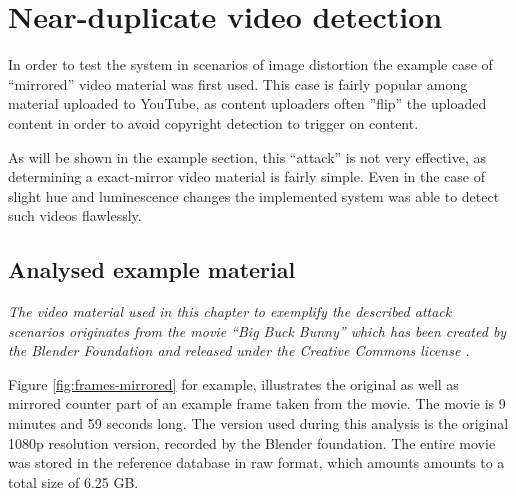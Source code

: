 \section{Near-duplicate video detection}
\label{sec:mirrored-video-detection}
In order to test the system in scenarios of image distortion the example case of ``mirrored'' video material was first used. This case is fairly popular among material uploaded to YouTube, as content uploaders often ''flip'' the uploaded content in order to avoid copyright detection to trigger on content.

As will be shown in the example section, this ``attack'' is not very effective, as determining a exact-mirror video material is fairly simple. Even in the case of slight hue and luminescence changes the implemented system was able to detect such videos flawlessly.

\subsection{Analysed example material}
\textit{The video material used in this chapter to exemplify the described attack scenarios originates from the movie ``\textit{Big Buck Bunny}'' \cite{big-buck-bunny} which has been created by the Blender Foundation \cite{blender-foundation} and released under the Creative Commons license \cite{creative-commons}.}

Figure \ref{fig:frames-mirrored} for example, illustrates the original as well as mirrored counter part of an example frame taken from the movie. The movie is 9 minutes and 59 seconds long. The version used during this analysis is the original 1080p resolution version, recorded by the Blender foundation. The entire movie was stored in the reference database in raw format, which amounts amounts to a total size of 6.25 GB.


